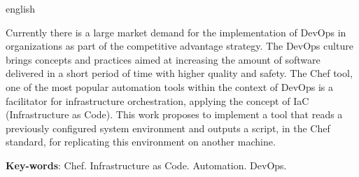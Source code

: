 \begin{resumo}[Abstract]
 \begin{otherlanguage*}{english}

    Currently there is a large market demand for the implementation
    of DevOps in organizations as part of the competitive advantage
    strategy. The DevOps culture brings concepts and practices aimed at increasing
    the amount of software delivered in a short period of time with higher quality
    and safety. The Chef tool, one of the most popular automation tools within the
    context of DevOps is a facilitator for infrastructure orchestration, applying
    the concept of IaC (Infrastructure as Code). This work proposes to implement a tool
    that reads a previously configured system environment and outputs a script,
    in the Chef standard, for replicating this environment on another machine.

   \vspace{\onelineskip}
 
   \noindent 
   \textbf{Key-words}: Chef. Infrastructure as Code. Automation. DevOps.
 \end{otherlanguage*}
\end{resumo}

